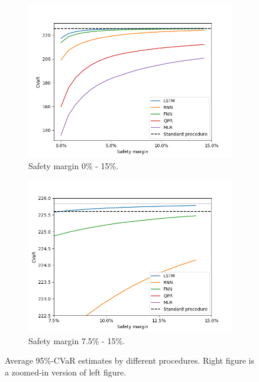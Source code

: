 \begin{figure}[ht!]
    \centering
    \begin{subfigure}{0.48\textwidth}
        \includegraphics[width=\textwidth]{./project2/figures/CVaR/allLN.png}
        \caption{Safety margin 0\% - 15\%.}
        \label{subfig2:AllSafetyMargin}
    \end{subfigure}
    \begin{subfigure}{0.48\textwidth}
        \includegraphics[width=\textwidth]{./project2/figures/CVaR/zoomedLN.png}
        \caption{Safety margin 7.5\% - 15\%.}
        \label{subfig2:ZoomedSafetyMargin}
    \end{subfigure}
    \caption{Average 95\%-CVaR estimates by different procedures. Right figure is a zoomed-in version of left figure.} 
    \label{fig2:CVaR95}
\end{figure}

